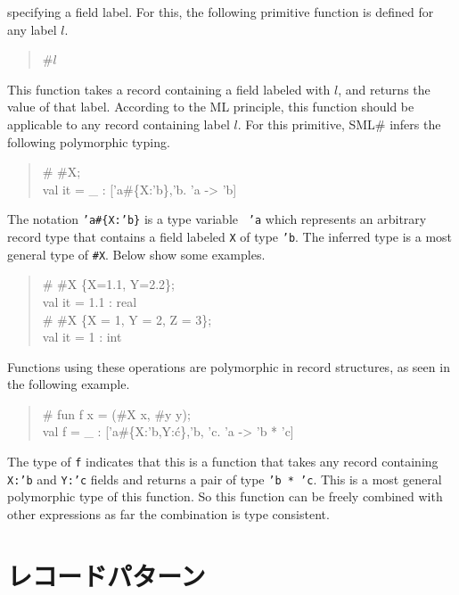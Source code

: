 \documentclass{jbook}
\newcommand{\txt}[2]{#1}
\newcommand{\smlsharp}{SML\#}
\newenvironment{program}{\begin{quote}\begin{tt}}%
                        {\end{tt}\end{quote}}
\begin{document}
specifying a field label.
	For this, the following primitive function is defined for any
label $l$.
\begin{program}
\#$l$
\end{program}
	This function takes a record containing a field labeled with
$l$, and returns the value of that label.
	According to the ML principle, this function should be
applicable to any record containing label $l$.
	For this primitive, \smlsharp{} infers the following
polymorphic typing.
\begin{program}
\# \#X;\\
val it = \_ : ['a\#\{X:'b\},'b. 'a -> 'b]
\end{program}
	The notation {\tt 'a\#\{X:'b\}} is a type variable {\tt
'a} which represents an arbitrary record type that contains a field
labeled {\tt X} of type {\tt 'b}.
	The inferred type is a most general type of {\tt \#X}.
	Below show some examples.
\begin{program}
\# \#X \{X=1.1, Y=2.2\};\\
val it = 1.1 : real\\
\# \#X \{X = 1, Y = 2, Z = 3\};\\
val it = 1 : int
\end{program}
	Functions using these operations are polymorphic in record
structures, as seen in the following example.
\begin{tt}\begin{quote}
\# fun f x = (\#X x, \#y y);\\
val f = \_ : ['a\#\{X:'b,Y:\'c\},'b, 'c. 'a -> 'b * 'c]
\end{quote}\end{tt}
	The type of {\tt f} indicates that this is a function that takes
any record containing {\tt X:'b} and {\tt Y:'c} fields and returns a pair 
of type {\tt 'b * 'c}.
	This is a most general polymorphic type of this function.
	So this function can be freely combined with other expressions
as far the combination is type consistent.
\fi%

\section{\txt{レコードパターン}{Record patterns}}
\label{sec:extensionRecordpattern}
\end{document}
